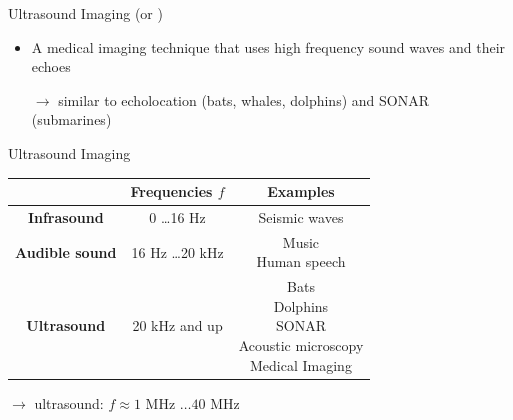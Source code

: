 \begin{frame}[c]{Ultrasound Imaging}
     (or )
    \begin{itemize}
        \item A medical imaging technique that uses high frequency sound waves and their echoes
        \item[$\rightarrow$] similar to echolocation (bats, whales, dolphins) and SONAR (submarines)
    \end{itemize}


\end{frame}


\begin{frame}{Ultrasound Imaging \cont}

    \vspace{.3cm}
    \begin{center}
        \begin{tabular}{c|c|c|}
            \hline
            {}                     & {Frequencies $f$}  & {Examples}         \\\hline\hline
            \textbf{Infrasound}    & 0 \dots 16 Hz      & Seismic waves      \\\hline
            \textbf{Audible sound} & 16 Hz \dots 20 kHz & \specialcell{Music \\Human speech}\\\hline
            \textbf{Ultrasound}    & 20 kHz and up      & \specialcell{Bats  \\Dolphins\\SONAR\\Acoustic microscopy\\Medical Imaging}\\\hline
        \end{tabular}
    \end{center}

    \vspace{.6cm}
    $\rightarrow$  ultrasound: $f \approx 1$ MHz $\dots 40$ MHz
\end{frame}


